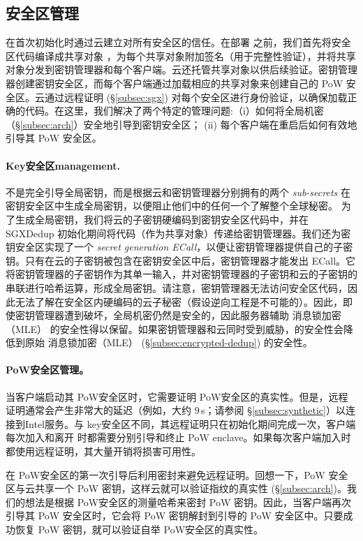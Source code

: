 \subsection{安全区管理}
\label{subsec:enclave-management}

\sysnameS 在首次初始化时通过云建立对所有安全区的信任。在部署 \sysnameS 之前，我们首先将安全区代码编译成共享对象 \cite{sgx}，为每个共享对象附加签名（用于完整性验证），并将共享对象分发到密钥管理器和每个客户端。云还托管共享对象以供后续验证。密钥管理器创建密钥安全区，而每个客户端通过加载相应的共享对象来创建自己的 PoW 安全区。云通过远程证明 (\S\ref{subsec:sgx}) 对每个安全区进行身份验证，以确保加载正确的代码。在这里，我们解决了两个特定的管理问题:（i）如何将全局机密（\S\ref{subsec:arch}）安全地引导到密钥安全区； (ii) 每个客户端在重启后如何有效地引导其 PoW 安全区。

\paragraph{Key安全区management.} \sysnameS 不是完全引导全局密钥，而是根据云和密钥管理器分别拥有的两个 \textit{ sub-secrets} 在密钥安全区中生成全局密钥，以便阻止他们中的任何一个了解整个全球秘密。
为了生成全局密钥，我们将云的子密钥硬编码到密钥安全区代码中，并在 SGXDedup 初始化期间将代码（作为共享对象）传递给密钥管理器。我们还为密钥安全区实现了一个\textit{ secret generation ECall}，以便让密钥管理器提供自己的子密钥。只有在云的子密钥被包含在密钥安全区中后，密钥管理器才能发出 ECall。它将密钥管理器的子密钥作为其单一输入，并对密钥管理器的子密钥和云的子密钥的串联进行哈希运算，形成全局密钥。请注意，密钥管理器无法访问安全区代码，因此无法了解在安全区内硬编码的云子秘密（假设逆向工程是不可能的）。因此，即使密钥管理器遭到破坏，全局机密仍然是安全的，因此服务器辅助 消息锁加密（MLE） 的安全性得以保留。如果密钥管理器和云同时受到威胁，\sysnameS 的安全性会降低到原始 消息锁加密（MLE） (\S\ref{subsec:encrypted-dedup}) 的安全性。

\paragraph{PoW安全区管理。} 当客户端启动其 PoW安全区时，它​​需要证明 PoW安全区的真实性。但是，远程证明通常会产生非常大的延迟（例如，大约 9\,s；请参阅 \S\ref{subsec:synthetic}）以连接到Intel服务。与 key安全区不同，其远程证明只在初始化期间完成一次，客户端每次加入和离开 \sysnameS 时都需要分别引导和终止 PoW enclave。如果每次客户端加入时都使用远程证明，其大量开销将损害可用性。

\sysnameS 在 PoW安全区的第一次引导后利用密封来避免远程证明。回想一下，PoW 安全区与云共享一个 PoW 密钥，这样云就可以验证指纹的真实性 (\S\ref{subsec:arch})。我们的想法是根据 PoW安全区的测量哈希来密封 PoW 密钥。因此，当客户端再次引导其 PoW 安全区时，它会将 PoW 密钥解封到引导的 PoW 安全区中。只要成功恢复 PoW 密钥，就可以验证自举 PoW安全区的真实性。

